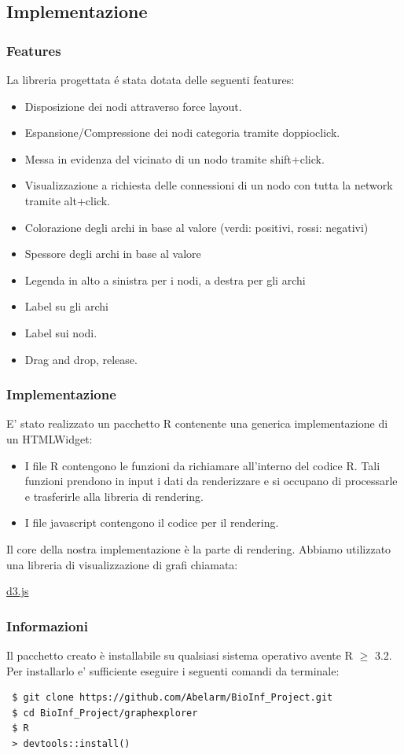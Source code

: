 \documentclass{beamer}
\begin{document}
\subsection{Implementazione}
\begin{frame}
\frametitle{Features}
La libreria progettata \'e stata dotata delle seguenti features:
\begin{itemize}
\item Disposizione dei nodi attraverso force layout.
\item Espansione/Compressione dei nodi categoria tramite doppioclick.
\item Messa in evidenza del vicinato di un nodo tramite shift+click.
\item Visualizzazione a richiesta delle connessioni di un nodo con tutta la network tramite alt+click.
\item Colorazione degli archi in base al valore (verdi: positivi, rossi: negativi)
\item Spessore degli archi in base al valore
\item Legenda in alto a sinistra per i nodi, a destra per gli archi
\item Label su gli archi
\item Label sui nodi.
\item Drag and drop, release.
\end{itemize}
\end{frame}

\begin{frame}
\frametitle{Implementazione}
E' stato realizzato un pacchetto R contenente una generica implementazione di un \alert{HTMLWidget}:
\begin{itemize}
	\item I file R contengono le funzioni da richiamare all'interno del codice R. Tali funzioni prendono in input i dati da renderizzare e si occupano di processarle e trasferirle alla libreria di rendering.
	\item I file javascript contengono il codice per il rendering.
\end{itemize}

Il core della nostra implementazione è la parte di rendering. Abbiamo utilizzato una libreria di visualizzazione di grafi chiamata:
\begin{center}
\href{http://d3js.org/}{d3.js}
\end{center}
\end{frame}

\begin{frame}[fragile]
\frametitle{Informazioni}
Il pacchetto creato è installabile su qualsiasi sistema operativo avente R $\geq$ 3.2.
Per installarlo e' sufficiente eseguire i seguenti comandi da terminale:
\begin{footnotesize}
\begin{lstlisting}
 $ git clone https://github.com/Abelarm/BioInf_Project.git
 $ cd BioInf_Project/graphexplorer
 $ R
 > devtools::install()
\end{lstlisting}
\end{footnotesize}
\end{frame}
\end{document}
